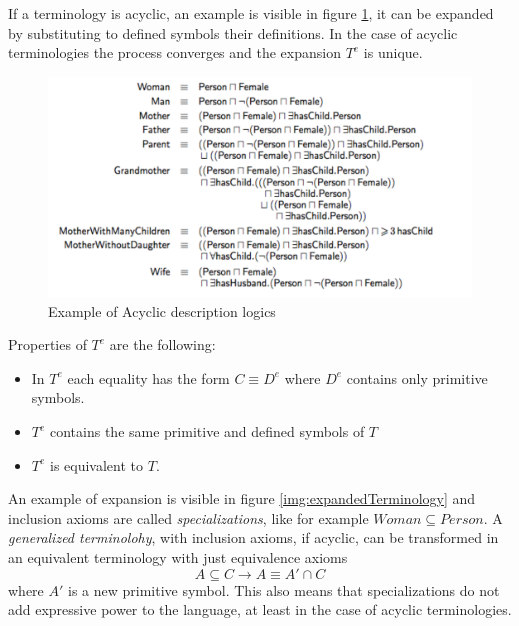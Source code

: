 If a terminology is acyclic, an example is visible in figure \ref{img:acyclicTerm}, it can
be expanded by substituting to defined symbols their definitions.\newline
In the case of acyclic terminologies the process converges and the expansion $T^e$ is unique.

\begin{figure}
	\includegraphics[width=\textwidth]{Images/acyclic}
	\caption{Example of Acyclic description logics}
	\label{img:acyclicTerm}
\end{figure}
Properties of $T^e$ are the following:
\begin{itemize}
   \item In $T^e$ each equality has the form $C \equiv D^e$ where $D^e$ contains only 
	 primitive symbols.
   \item $T^e$ contains the same primitive and defined symbols of $T$
   \item $T^e$ is equivalent to $T$.
\end{itemize}
An example of expansion is visible in figure \ref{img:expandedTerminology} and inclusion
axioms are called \emph{specializations}, like for example $Woman \subseteq Person$.\newline
A \emph{generalized terminolohy}, with inclusion axioms, if acyclic, can be transformed in 
an equivalent terminology with just equivalence axioms
\[ A \subseteq C \to A \equiv A' \cap C \]
where $A'$ is a new primitive symbol.\newline
This also means that specializations do not add expressive power to the language, 
at least in the case of acyclic terminologies.

